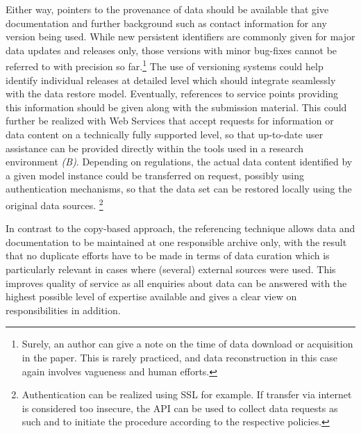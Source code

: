\documentclass{sig-alternate}
\begin{document}
Either way, pointers to the provenance of data should be available that give documentation and further background such as contact information for any version being used.
While new persistent identifiers are commonly given for major data updates and releases only, those versions with minor bug-fixes cannot be referred to with precision so far.\footnote{Surely, an author can give a note on the time of data download or acquisition in the paper. This is rarely practiced, and data reconstruction in this case again involves vagueness and human efforts.}
The use of versioning systems could help identify individual releases at detailed level \cite{KoenkerZeileis2009} which should integrate seamlessly with the data restore model.
Eventually, references to service points providing this information should be given along with the submission material.
This could further be realized with Web Services that accept requests for information or data content on a technically fully supported level, so that up-to-date user assistance can be provided directly within the tools used in a research environment \textit{(B)}.
Depending on regulations, the actual data content identified by a given model instance could be transferred on request, possibly using authentication mechanisms, so that the data set can be restored locally using the original data sources.
\footnote{Authentication can be realized using SSL for example. If transfer via internet is considered too insecure, the API can be used to collect data requests as such and to initiate the procedure according to the respective policies.}


In contrast to the copy-based approach, the referencing technique allows data and documentation to be maintained at one responsible archive only, with the result that no duplicate efforts have to be made in terms of data curation which is particularly relevant in cases where (several) external sources were used.
This improves quality of service as all enquiries about data can be answered with the highest possible level of expertise available and gives a clear view on responsibilities in addition.
\end{document}
